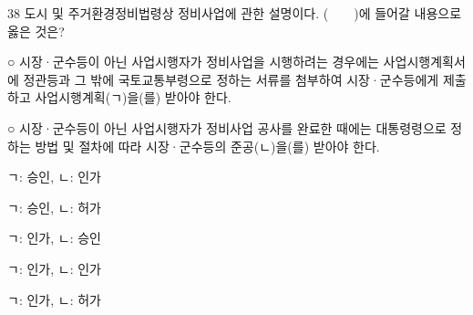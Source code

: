 \begin{question}{38}
도시 및 주거환경정비법령상 정비사업에 관한 설명이다. (　　)에 들어갈 내용으로 옳은 것은?
\begin{framedtext}
○ 시장·군수등이 아닌 사업시행자가 정비사업을 시행하려는 경우에는 사업시행계획서에 정관등과 그 밖에 국토교통부령으로 정하는 서류를 첨부하여 시장·군수등에게 제출하고 사업시행계획(ㄱ)을(를) 받아야 한다. \par
○ 시장·군수등이 아닌 사업시행자가 정비사업 공사를 완료한 때에는 대통령령으로 정하는 방법 및 절차에 따라 시장·군수등의 준공(ㄴ)을(를) 받아야 한다. \par
\end{framedtext}
\begin{choices}
  \item ㄱ: 승인, ㄴ: 인가
  \item ㄱ: 승인, ㄴ: 허가
  \item ㄱ: 인가, ㄴ: 승인
  \item ㄱ: 인가, ㄴ: 인가
  \item ㄱ: 인가, ㄴ: 허가
\end{choices}
\end{question}
